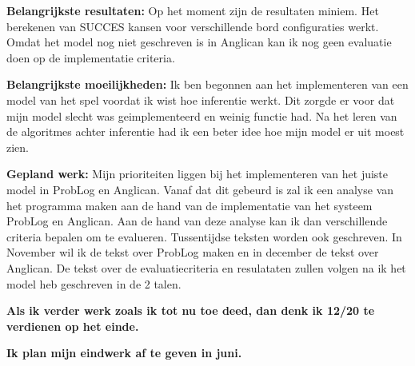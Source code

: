 \documentclass[12pt]{report}
\begin{document}
\vspace{1cm}
{\bf Belangrijkste resultaten:}
Op het moment zijn de resultaten miniem. Het berekenen van SUCCES kansen voor verschillende bord configuraties werkt. Omdat het model nog niet geschreven is in Anglican kan ik nog geen evaluatie doen op de implementatie criteria.


\vspace{1cm}
{\bf Belangrijkste moeilijkheden:}
Ik ben begonnen aan het implementeren van een model van het spel voordat ik wist hoe inferentie werkt. Dit zorgde er voor dat mijn model slecht was geimplementeerd en weinig functie had. Na het leren van de algoritmes achter inferentie had ik een beter idee hoe mijn model er uit moest zien.

\vspace{1cm}
{\bf Gepland werk:} 
Mijn prioriteiten liggen bij het implementeren van het juiste model in ProbLog en Anglican. Vanaf dat dit gebeurd is zal ik een analyse van het programma maken aan de hand van de implementatie van het systeem ProbLog en Anglican. Aan de hand van deze analyse kan ik dan verschillende criteria bepalen om te evalueren. Tussentijdse teksten worden ook geschreven. In November wil ik de tekst over ProbLog maken en in december de tekst over Anglican. De tekst over de evaluatiecriteria en resulataten zullen volgen na ik het model heb geschreven in de 2 talen.


\vspace{1cm}
{\bf Als ik verder werk zoals ik tot nu toe deed, dan denk ik 12/20 te
    verdienen op het einde.}

{\bf Ik plan mijn eindwerk af te geven in juni.} 
\end{document}
